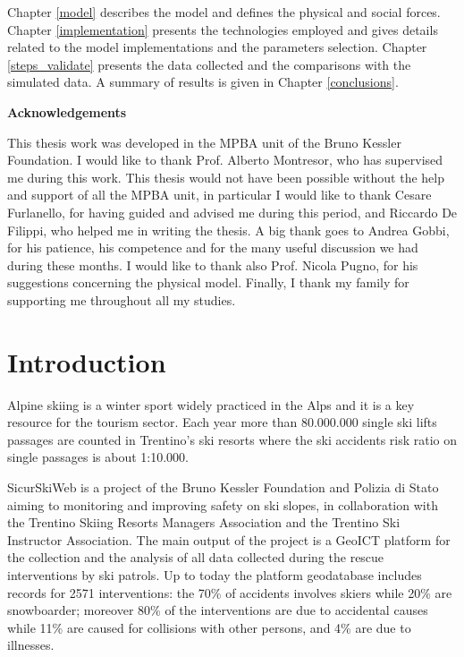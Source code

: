\documentclass[12pt,a4paper,twoside]{book}
\makeatletter
\newcommand\ackname{Acknowledgements}
\newenvironment{acknowledgements}{%
      \titlepage
      \null\vfil
      \@beginparpenalty\@lowpenalty
      \begin{center}%
        \bfseries \ackname
        \@endparpenalty\@M
      \end{center}}%
     {\par\vfil\null\endtitlepage}
\newenvironment{acknowledgements}{%
      \if@twocolumn
        \section*{\abstractname}%
      \else
        \small
        \begin{center}%
          {\bfseries \ackname\vspace{-.5em}\vspace{\z@}}%
        \end{center}%
        \quotation
      \fi}
      {\if@twocolumn\else\endquotation\fi}
\makeatother
\begin{document}
Chapter \ref{model} describes the model and defines the physical and social forces. Chapter \ref{implementation} presents the technologies employed and gives details related to the model implementations and the parameters selection. Chapter \ref{steps_validate} presents the data collected and the comparisons with the simulated data. A summary of results is given in Chapter \ref{conclusions}.

\begin{acknowledgements}
This thesis work was developed in the MPBA unit of the Bruno Kessler Foundation. I would like to thank Prof. Alberto Montresor, who has supervised me during this work. This thesis would not have been possible without the help and support of all the MPBA unit, in particular I would like to thank Cesare Furlanello, for having guided and advised me during this period, and Riccardo De Filippi, who helped me in writing the thesis. A big thank goes to Andrea Gobbi, for his patience, his competence and for the many useful discussion we had during these months. I would like to thank also Prof. Nicola Pugno, for his suggestions concerning the physical model. Finally, I thank my family for supporting me throughout all my studies.
\end{acknowledgements}

\tableofcontents

\chapter{Introduction}
Alpine skiing is a winter sport widely practiced in the Alps and it is a key resource for the tourism sector. Each year more than 80.000.000 single ski lifts passages are counted in Trentino's ski resorts where the ski accidents risk ratio on single passages is about 1:10.000.

SicurSkiWeb is a project of the Bruno Kessler Foundation and Polizia di Stato aiming to monitoring and improving safety on ski slopes, in collaboration with the Trentino Skiing Resorts Managers Association and the Trentino Ski Instructor Association. The main output of the project is a GeoICT platform for the collection and the analysis of all data collected during the rescue interventions by ski patrols. Up to today the platform geodatabase includes records for 2571 interventions: the 70\% of accidents involves skiers while 20\% are snowboarder; moreover 80\% of the interventions are due to accidental causes while 11\% are caused for collisions with other persons, and 4\% are due to illnesses.
\end{document}
